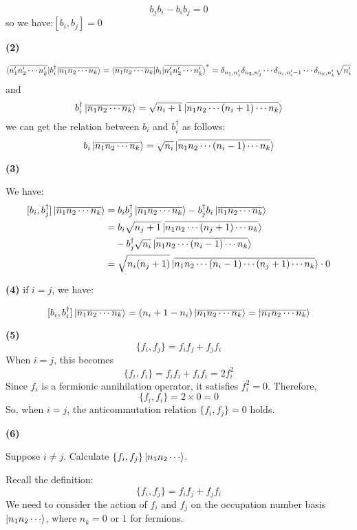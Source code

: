 \documentclass[12pt]{article}
\begin{document}
\[b_j b_i - b_i b_j = 0\]
so we have:$[b_i,b_j]=0$


\textbf{(2)}

\[
\braket{\overline{n_1' n_2' \cdots n_k'}|b_i^\dagger|\overline{n_1 n_2 \cdots n_k}} = \braket{\overline{n_1 n_2 \cdots n_k}|b_i|\overline{n_1' n_2' \cdots n_k'}}^*=\delta_{n_1,n_1'}\delta_{n_2,n_2'}\cdots \delta_{n_i,n_i'-1}\cdots \delta_{n_k,n_k'}\sqrt{n_i'}
\]
and \[b_i^\dagger \ket{\overline{n_1 n_2 \cdots n_k}} = \sqrt{n_i + 1} \ket{\overline{n_1 n_2 \cdots (n_i + 1) \cdots n_k}}\]
we can get the relation between $b_i$ and $b_i^\dagger$ as follows:
\[
b_i \ket{\overline{n_1 n_2 \cdots n_k}} = \sqrt{n_i} \ket{\overline{n_1 n_2 \cdots (n_i - 1) \cdots n_k}}
\] 

\textbf{(3)}


We have:
\[
\begin{aligned}
[b_i, b_j^\dagger] \ket{\overline{n_1 n_2 \cdots n_k}} &= b_i b_j^\dagger \ket{\overline{n_1 n_2 \cdots n_k}} - b_j^\dagger b_i \ket{\overline{n_1 n_2 \cdots n_k}} \\
&= b_i\sqrt{n_j+1}\ket{\overline{n_1 n_2 \cdots (n_j+1) \cdots n_k}} \\
&\quad - b_j^\dagger\sqrt{n_i}\ket{\overline{n_1 n_2 \cdots (n_i-1) \cdots n_k}} \\
&=\sqrt{n_i(n_j+1)}\ket{\overline{n_1 n_2 \cdots (n_i-1) \cdots (n_j+1) \cdots n_k}}\cdot0 \\
\end{aligned}
\]


\textbf{(4)}
if $i = j$, we have:

\[[b_i, b_i^\dagger] \ket{\overline{n_1 n_2 \cdots n_k}} = (n_i + 1 - n_i) \ket{\overline{n_1 n_2 \cdots n_k}} = \ket{\overline{n_1 n_2 \cdots n_k}}\]

\textbf{(5)}
\[
\{f_i, f_j\} = f_i f_j + f_j f_i
\]
When $i = j$, this becomes
\[
\{f_i, f_i\} = f_i f_i + f_i f_i = 2 f_i^2
\]
Since $f_i$ is a fermionic annihilation operator, it satisfies $f_i^2 = 0$. Therefore,
\[
\{f_i, f_i\} = 2 \times 0 = 0
\]
So, when $i = j$, the anticommutation relation $\{f_i, f_j\} = 0$ holds.

\textbf{(6)}

Suppose $i \neq j$. Calculate $\{f_i, f_j\} \ket{n_1 n_2 \cdots}$. 

Recall the definition:
\[
\{f_i, f_j\} = f_i f_j + f_j f_i
\]
We need to consider the action of $f_i$ and $f_j$ on the occupation number basis $\ket{n_1 n_2 \cdots}$, where $n_k = 0$ or $1$ for fermions.
\end{document}
